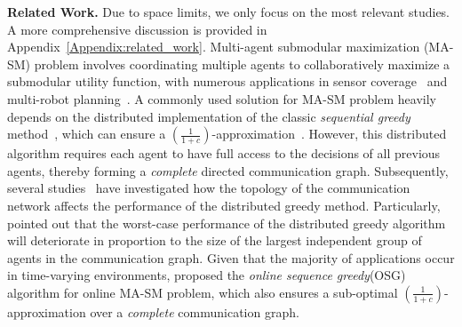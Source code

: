 \textbf{Related Work.} Due to space limits, we only focus on the most relevant studies. A more comprehensive discussion is provided in Appendix~\ref{Appendix:related_work}. Multi-agent submodular maximization (MA-SM) problem involves coordinating multiple agents to collaboratively maximize a submodular utility function, with numerous applications in sensor coverage~\citep{krause2008near,prajapat2022near} and multi-robot planning~\citep{singh2009efficient,zhou2022risk}. A commonly used solution for MA-SM problem heavily depends on the distributed implementation of the classic \emph{sequential greedy} method~\citep{fisher1978analysis}, which can ensure a $(\frac{1}{1+c})$-approximation~\citep{conforti1984submodular}. However, this distributed algorithm requires each agent to have full access to the decisions of all previous agents, thereby forming a \emph{complete} directed communication graph. Subsequently, several studies~\citep{grimsman2018impact,gharesifard2017distributed,marden2016role} have investigated how the topology of the communication network affects the performance of the distributed greedy method. Particularly, \citet{grimsman2018impact} pointed out that the worst-case performance of the distributed greedy algorithm will deteriorate in proportion to the size of the largest independent group of agents in the communication graph. Given that the majority of applications occur in time-varying environments, \cite{xu2023online} proposed the \emph{online sequence greedy}(OSG) algorithm for online MA-SM problem, which also ensures a sub-optimal $(\frac{1}{1+c})$-approximation over a \emph{complete} communication graph.